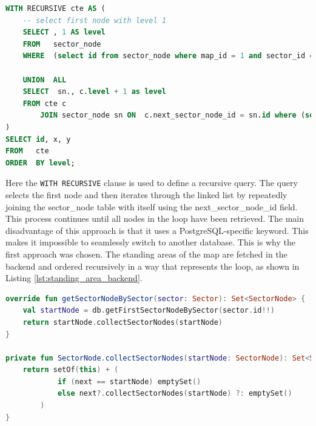 \begin{lstlisting}[language=SQL, caption=Recursive Query, label=lst:recursive_query]
WITH RECURSIVE cte AS (
    -- select first node with level 1
    SELECT , 1 AS level
    FROM   sector_node
    WHERE  (select id from sector_node where map_id = 1 and sector_id = 1 LIMIT 1) = id

    UNION  ALL
    SELECT  sn., c.level + 1 as level
    FROM cte c
        JOIN sector_node sn ON  c.next_sector_node_id = sn.id where (select id from sector_node where map_id = 1 and sector_id = 1 LIMIT 1) != sn.id
)
SELECT id, x, y
FROM   cte
ORDER  BY level;
\end{lstlisting}

Here the \texttt{WITH RECURSIVE} clause is used to define a recursive query. The query selects the first node and then iterates through the linked list by repeatedly joining the sector\_node table with itself using the next\_sector\_node\_id field. This process continues until all nodes in the loop have been retrieved. The main disadvantage of this approach is that it uses a PostgreSQL-specific keyword. This makes it impossible to seamlessly switch to another database. This is why the first approach was chosen. The standing areas of the map are fetched in the backend and ordered recursively in a way that represents the loop, as shown in Listing \ref{lst:standing_area_backend}.

\begin{lstlisting}[language=Kotlin, caption=Standing Area Backend, label=lst:standing_area_backend]
override fun getSectorNodeBySector(sector: Sector): Set<SectorNode> {
    val startNode = db.getFirstSectorNodeBySector(sector.id!!)
    return startNode.collectSectorNodes(startNode)
}

private fun SectorNode.collectSectorNodes(startNode: SectorNode): Set<SectorNode> {
    return setOf(this) + (
            if (next == startNode) emptySet() 
            else next?.collectSectorNodes(startNode) ?: emptySet()
        )
}
\end{lstlisting}